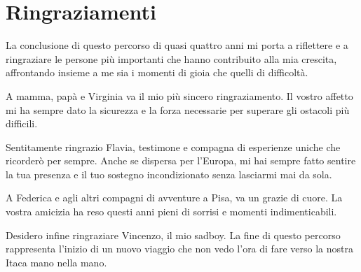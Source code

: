\thispagestyle{fancy}			%
\setlength{\parskip}{0pt plus 3.0pt}
\section*{Ringraziamenti}

La conclusione di questo percorso di quasi quattro anni mi porta a riflettere e a ringraziare le persone più importanti che hanno contribuito alla mia crescita, affrontando insieme a me sia i momenti di gioia che quelli di difficoltà.

\noindent A mamma, papà e Virginia va il mio più sincero ringraziamento. Il vostro affetto mi ha sempre dato la sicurezza e la forza necessarie per superare gli ostacoli più difficili.

\noindent  Sentitamente ringrazio Flavia, testimone e compagna di esperienze uniche che ricorderò per sempre. Anche se dispersa per l'Europa, mi hai sempre fatto sentire la tua presenza e il tuo sostegno incondizionato senza lasciarmi mai da sola.

\noindent  A Federica e agli altri compagni di avventure a Pisa, va un grazie di cuore. La vostra amicizia ha reso questi anni pieni di sorrisi e momenti indimenticabili.
 
\noindent  Desidero infine ringraziare Vincenzo, il mio sadboy. La fine di questo percorso rappresenta l'inizio di un nuovo viaggio che non vedo l'ora di fare verso la nostra Itaca mano nella mano. 